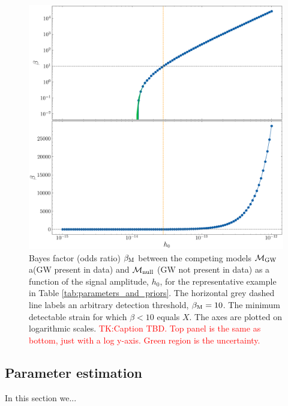 \documentclass[fleqn,usenatbib,useAMS]{mnras}
\begin{document}
\begin{figure}
	\includegraphics[width=\textwidth, height =\textwidth]{images/ExampleBayesFigure} 	
	\caption{Bayes factor (odds ratio) $\beta_{\rm M}$ between the competing models $\mathcal{M}_{\rm GW}$ a(GW present in data) and $\mathcal{M}_{\rm null}$ (GW not present in data) as a function of the signal amplitude, $h_0$, for the representative example in Table \ref{tab:parameters_and_priors}. The horizontal grey dashed line labels an arbitrary detection threshold, $\beta_{\rm M} = 10$. The minimum detectable strain for which $\beta < 10$ equals $X$. The axes are plotted on logarithmic scales. \textcolor{red}{TK:Caption TBD. Top panel is the same as bottom, just with a log y-axis. Green region is the uncertainty.}}
	\label{fig:bayes1}
\end{figure}



\subsection{Parameter estimation}\label{sec:parameter_esimation}

In this section we...
\end{document}
